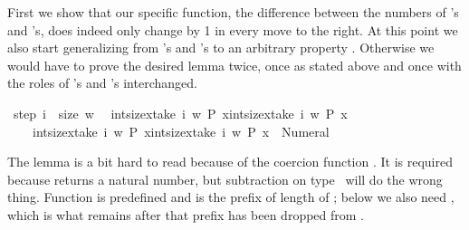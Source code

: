 \begin{isabellebody}
\begin{isamarkuptext}
First we show that our specific function, the difference between the
numbers of 's and 's, does indeed only change by 1 in every
move to the right. At this point we also start generalizing from 's
and 's to an arbitrary property . Otherwise we would have
to prove the desired lemma twice, once as stated above and once with the
roles of 's and 's interchanged.%
\end{isamarkuptext}%
\isamarkuptrue%
\ step{}{\isacharcolon}\ {\isachardoublequote}{\isasymforall}i\ {\isacharless}\ size\ w{\isachardot}\isanewline
\ \ {\isasymbar}{\isacharparenleft}int{\isacharparenleft}size{\isacharbrackleft}x{\isasymin}take\ {\isacharparenleft}i{\isacharplus}{}{\isacharparenright}\ w{\isachardot}\ P\ x{\isacharbrackright}{\isacharparenright}{\isacharminus}int{\isacharparenleft}size{\isacharbrackleft}x{\isasymin}take\ {\isacharparenleft}i{\isacharplus}{}{\isacharparenright}\ w{\isachardot}\ {\isasymnot}P\ x{\isacharbrackright}{\isacharparenright}{\isacharparenright}\isanewline
\ \ \ {\isacharminus}\ {\isacharparenleft}int{\isacharparenleft}size{\isacharbrackleft}x{\isasymin}take\ i\ w{\isachardot}\ P\ x{\isacharbrackright}{\isacharparenright}{\isacharminus}int{\isacharparenleft}size{\isacharbrackleft}x{\isasymin}take\ i\ w{\isachardot}\ {\isasymnot}P\ x{\isacharbrackright}{\isacharparenright}{\isacharparenright}{\isasymbar}\ {\isasymle}\ Numeral{}{\isachardoublequote}\isamarkupfalse%
%
\begin{isamarkuptxt}%
\noindent
The lemma is a bit hard to read because of the coercion function
. It is required because  returns
a natural number, but subtraction on type~ will do the wrong thing.
Function  is predefined and  is the prefix of
length  of ; below we also need , which
is what remains after that prefix has been dropped from .


\end{isamarkuptxt}
\end{isabellebody}
